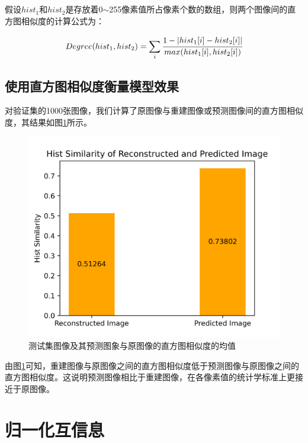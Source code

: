 \hspace*{\fill} \

\hspace*{\fill} \

\hspace*{\fill} \

\hspace*{\fill} \

假设$hist_1$和$hist_2$是存放着0$ \sim $255像素值所占像素个数的数组，则两个图像间的直方图相似度的计算公式为：

\begin{equation}\label{609}
	Degree(hist_1,hist_2)=\sum_i\cfrac{1 - |hist_1[i] - hist_2[i]|}{max(hist_1[i],hist_2[i])}
\end{equation}

\subsection{使用直方图相似度衡量模型效果}
对验证集的1000张图像，我们计算了原图像与重建图像或预测图像间的直方图相似度，其结果如图\ref{fig610}所示。

\begin{figure}[h]
	\centering
	\includegraphics[width=0.75\columnwidth]{image/chap06/img610.png}
	\caption{测试集图像及其预测图象与原图像的直方图相似度的均值}
	\label{fig610}
\end{figure}

由图\ref{fig610}可知，重建图像与原图像之间的直方图相似度低于预测图像与原图像之间的直方图相似度。这说明预测图像相比于重建图像，在各像素值的统计学标准上更接近于原图像。

\section{归一化互信息}
